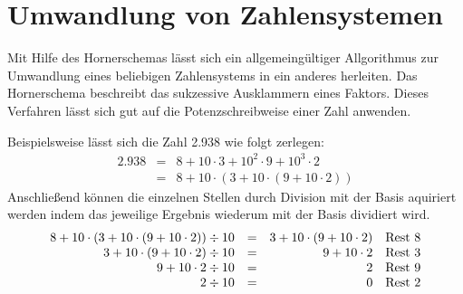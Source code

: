 \documentclass[11pt,a4paper]{scrreprt}
\begin{document}



\section{Umwandlung von Zahlensystemen}
Mit Hilfe des Hornerschemas lässt sich ein allgemeingültiger Allgorithmus zur Umwandlung eines beliebigen Zahlensystems in ein anderes herleiten. Das Hornerschema beschreibt das sukzessive Ausklammern eines Faktors. Dieses Verfahren lässt sich gut auf die Potenzschreibweise einer Zahl anwenden.

Beispielsweise lässt sich die Zahl 2.938 wie folgt zerlegen:
\begin{eqnarray*}
	2.938 & = & 8 + 10 \cdot 3 + 10^2 \cdot 9 + 10^3 \cdot 2 \\
	& = & 8 + 10 \cdot (3 + 10 \cdot(9 + 10 \cdot 2))
\end{eqnarray*}
Anschließend können die einzelnen Stellen durch Division mit der Basis aquiriert werden indem das jeweilige Ergebnis wiederum mit der Basis dividiert wird.
$$
\begin{array}{rrrl}
  8 + 10 \cdot (3 + 10 \cdot(9 + 10 \cdot 2)) \div 10 & = & 3 + 10 \cdot(9 + 10 \cdot 2)  & \textnormal{Rest } 8 \\
  3 + 10 \cdot(9 + 10 \cdot 2) \div 10 & = & 9 + 10 \cdot 2  & \textnormal{Rest } 3 \\
  9 + 10 \cdot 2 \div 10 & = & 2  & \textnormal{Rest } 9 \\
  2 \div 10 & = & 0  & \textnormal{Rest } 2 \\
\end{array}
$$
\end{document}
